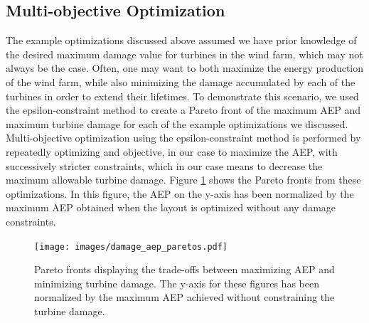 \documentclass[11pt,letterpaper]{article}
\begin{document}
\subsection{Multi-objective Optimization}

The example optimizations discussed above assumed we have prior knowledge of the desired maximum damage value for turbines in the wind farm, which may not always be the case. Often, one may want to both maximize the energy production of the wind farm, while also minimizing the damage accumulated by each of the turbines in order to extend their lifetimes. To demonstrate this scenario, we used the epsilon-constraint method to create a Pareto front of the maximum AEP and maximum turbine damage for each of the example optimizations we discussed. Multi-objective optimization using the epsilon-constraint method is performed by repeatedly optimizing and objective, in our case to maximize the AEP, with successively stricter constraints, which in our case means to decrease the maximum allowable turbine damage. Figure \ref{pareto} shows the Pareto fronts from these optimizations. In this figure, the AEP on the y-axis has been normalized by the maximum AEP obtained when the layout is optimized without any damage constraints. 
% 
\begin{figure}
    \centering
    \texttt{[image: images/damage\_aep\_paretos.pdf]}
    \caption{Pareto fronts displaying the trade-offs  between maximizing AEP and minimizing turbine damage. The y-axis for these figures has been normalized by the maximum AEP achieved without constraining the turbine damage.}
    \label{pareto}
\end{figure}
\end{document}
